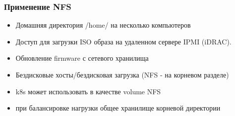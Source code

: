\begin{frame}
    \frametitle{Применение NFS}

    \begin{itemize}
        \item Домашняя директория /home/ на несколько компьютеров
        \item Доступ для загрузки ISO образа на удаленном сервере IPMI (iDRAC).
        \item Обновление firmware с сетевого хранилища
        \item Бездисковые хосты/бездисковая загрузка (NFS - на корневом разделе)
        \item k8s может использовать в качестве volume NFS 
        \item при балансировке нагрузки общее хранилище корневой директории
    \end{itemize}

\end{frame}